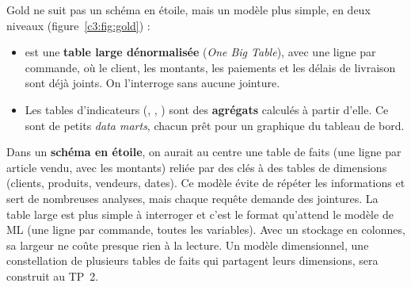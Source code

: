 \begin{notion}
Gold ne suit pas un schéma en étoile, mais un modèle plus
simple, en deux niveaux (figure~\ref{c3:fig:gold}) :
\begin{itemize}[leftmargin=*,itemsep=1pt,topsep=2pt]
\item {} est une \textbf{table large dénormalisée} (\emph{One Big Table}), avec une
  ligne par commande, où le client, les montants, les paiements et les délais de livraison sont
  déjà joints. On l'interroge sans aucune jointure.
\item Les tables d'indicateurs (, ,
  ) sont des \textbf{agrégats} calculés à partir d'elle. Ce sont de petits
  \emph{data marts}, chacun prêt pour un graphique du tableau de bord.
\end{itemize}
Dans un \textbf{schéma en étoile}, on aurait au centre une table de faits (une ligne par article
vendu, avec les montants) reliée par des clés à des tables de dimensions (clients, produits,
vendeurs, dates). Ce modèle évite de répéter les informations et sert de nombreuses analyses, mais
chaque requête demande des jointures. La table large est plus simple à interroger et c'est le
format qu'attend le modèle de ML (une ligne par commande, toutes les variables). Avec un stockage
en colonnes, sa largeur ne coûte presque rien à la lecture. Un modèle dimensionnel, une constellation
de plusieurs tables de faits qui partagent leurs dimensions, sera construit au TP~2.
\end{notion}

